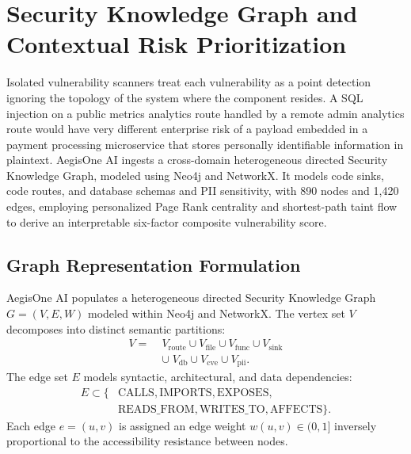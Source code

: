 \documentclass[journal,twoside]{IEEEtran}
\begin{document}
\section{Security Knowledge Graph and Contextual Risk Prioritization}
Isolated vulnerability scanners treat each vulnerability as a point detection ignoring the topology of the system where the component resides. A SQL injection on a public metrics analytics route handled by a remote admin analytics route would have very different enterprise risk of a payload embedded in a payment processing microservice that stores personally identifiable information in plaintext. AegisOne AI ingests a cross-domain heterogeneous directed Security Knowledge Graph, modeled using Neo4j and NetworkX. It models code sinks, code routes, and database schemas and PII sensitivity, with 890 nodes and 1,420 edges, employing personalized Page Rank centrality and shortest-path taint flow to derive an interpretable six-factor composite vulnerability score.

\subsection{Graph Representation Formulation}
AegisOne AI populates a heterogeneous directed Security Knowledge Graph $G = (V, E, W)$ modeled within Neo4j and NetworkX. The vertex set $V$ decomposes into distinct semantic partitions:
\begin{equation}
\begin{aligned}
V = \; & V_{\text{route}} \cup V_{\text{file}} \cup V_{\text{func}} \cup V_{\text{sink}} \\
       & \cup \; V_{\text{db}} \cup V_{\text{cve}} \cup V_{\text{pii}}.
\end{aligned}
\end{equation}
The edge set $E$ models syntactic, architectural, and data dependencies:
\begin{equation}
\begin{aligned}
E \subset \{ & \text{CALLS}, \text{IMPORTS}, \text{EXPOSES}, \\
             & \text{READS\_FROM}, \text{WRITES\_TO}, \text{AFFECTS} \}.
\end{aligned}
\end{equation}
Each edge $e = (u, v)$ is assigned an edge weight $w(u, v) \in (0, 1]$ inversely proportional to the accessibility resistance between nodes.
\end{document}
